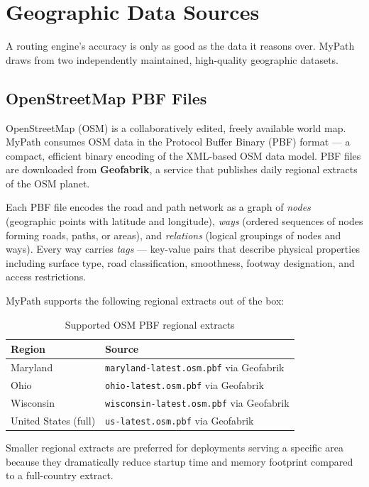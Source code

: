 \documentclass[12pt, a4paper]{report}
\begin{document}
\section{Geographic Data Sources}
\label{sec:datasources}

A routing engine's accuracy is only as good as the data it reasons over. MyPath draws from two independently maintained, high-quality geographic datasets.

\subsection{OpenStreetMap PBF Files}
\label{subsec:osm}

OpenStreetMap (OSM) is a collaboratively edited, freely available world map. MyPath consumes OSM data in the Protocol Buffer Binary (PBF) format — a compact, efficient binary encoding of the XML-based OSM data model. PBF files are downloaded from \textbf{Geofabrik}, a service that publishes daily regional extracts of the OSM planet.

Each PBF file encodes the road and path network as a graph of \emph{nodes} (geographic points with latitude and longitude), \emph{ways} (ordered sequences of nodes forming roads, paths, or areas), and \emph{relations} (logical groupings of nodes and ways). Every way carries \emph{tags} — key-value pairs that describe physical properties including surface type, road classification, smoothness, footway designation, and access restrictions.

MyPath supports the following regional extracts out of the box:

\begin{table}[H]
\centering
\caption{Supported OSM PBF regional extracts}
\begin{tabular}{@{}ll@{}}
\toprule
\textbf{Region} & \textbf{Source} \\
\midrule
Maryland & \texttt{maryland-latest.osm.pbf} via Geofabrik \\
Ohio & \texttt{ohio-latest.osm.pbf} via Geofabrik \\
Wisconsin & \texttt{wisconsin-latest.osm.pbf} via Geofabrik \\
United States (full) & \texttt{us-latest.osm.pbf} via Geofabrik \\
\bottomrule
\end{tabular}
\end{table}

Smaller regional extracts are preferred for deployments serving a specific area because they dramatically reduce startup time and memory footprint compared to a full-country extract.
\end{document}
